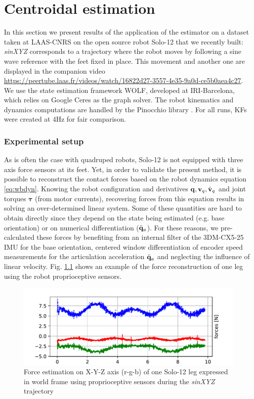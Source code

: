 \chapter{Centroidal estimation}
\minitoc




In this section we present results of the application of the estimator on a dataset taken at LAAS-CNRS on the open source robot Solo-12 \cite{grimminger2020open} that we recently built:
\textit{sinXYZ} corresponds to a trajectory where the robot moves by following a sine wave reference with the feet fixed in place. This movement and another one are displayed in the companion video \url{https://peertube.laas.fr/videos/watch/16822d27-3557-4e35-9a0d-ce5b0aea4c27}.
%
We use the state estimation framework WOLF, developed at IRI-Barcelona, which relies on Google Ceres \cite{ceres-solver} as the graph solver. The robot kinematics and dynamics computations are handled by the Pinocchio library \cite{carpentier2015pinocchio}. For all runs, KFs were created  at 4Hz for fair comparison.


\subsection{Experimental setup}
%  
As is often the case with quadruped robots, Solo-12 is not equipped with three axis force sensors at its feet. Yet, in order to validate the present method, it is possible to reconstruct the contact forces based on the robot dynamics equation \eqref{eq:wbdyn}. Knowing the robot configuration and derivatives ${\bf q},{\bf v}_q,\dot{{\bf v}}_q$ and joint torques $\bm\tau$ (from motor currents), recovering forces from this equation results in solving an over-determined linear system. Some of these quantities are hard to obtain directly since they depend on the state being estimated (e.g. base orientation) or on numerical differentiation ($\ddot{{\bf q}}_a$). For these reasons, we pre-calculated these forces by benefiting from an internal filter of the 3DM-CX5-25 IMU for the base orientation, centered window differentiation of encoder speed measurements for the articulation acceleration $\ddot{{\bf q}}_a$ and neglecting the influence of linear velocity. Fig. \ref{fig:force_est} shows an example of the force reconstruction of one leg using the robot proprioceptive sensors.
%
\begin{figure}
    \centering
    \includegraphics[width=0.9\columnwidth]{figures/centroidal/forces_solo_1leg.pdf}
    \caption{Force estimation on X-Y-Z axis (r-g-b) of one Solo-12 leg expressed in world frame using proprioceptive sensors during the \textit{sinXYZ} trajectory}
    \label{fig:force_est}
\end{figure}

